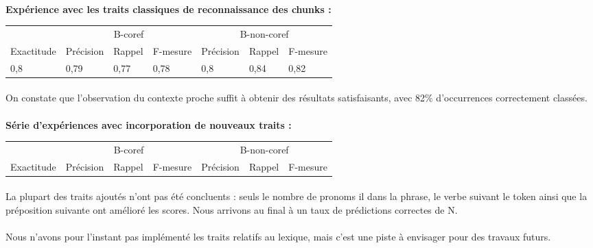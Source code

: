 \documentclass[a4paper,12pt]{article}
\begin{document}
\paragraph{}
\textbf{Expérience avec les traits classiques de reconnaissance des chunks :}

\begin{tabular}[H]{l|lll|lll}
& \multicolumn{3}{c|}{B-coref} & \multicolumn{3}{c}{B-non-coref}\\
Exactitude & Précision & Rappel & F-mesure & Précision & Rappel & F-mesure\\
\hline
0,8 & 0,79 & 0,77 & 0,78 & 0,8 & 0,84 & 0,82\\
\hline
\end{tabular}

\paragraph{}
On constate que l'observation du contexte proche suffit à obtenir des résultats satisfaisants, avec 82\% d'occurrences correctement classées.

\paragraph{}
\textbf{Série d'expériences avec incorporation de nouveaux traits :}

\begin{tabular}[H]{l|lll|lll}
& \multicolumn{3}{c|}{B-coref} & \multicolumn{3}{c}{B-non-coref}\\
Exactitude & Précision & Rappel & F-mesure & Précision & Rappel & F-mesure\\
\hline

\hline
\end{tabular}

\paragraph{}
La plupart des traits ajoutés n'ont pas été concluents : seuls le nombre de pronoms \og il \fg{} dans la phrase, le verbe suivant le token ainsi que la préposition suivante ont amélioré les scores. Nous arrivons au final à un taux de prédictions correctes de N.

\paragraph{}
Nous n'avons pour l'instant pas implémenté les traits relatifs au lexique, mais c'est une piste à envisager pour des travaux futurs.
\end{document}
